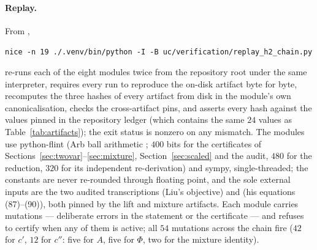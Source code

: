 \documentclass[11pt]{article}
\theoremstyle{plain}
\theoremstyle{definition}
\theoremstyle{remark}
\begin{document}
\paragraph{Replay.}
From ,
\begin{center}
\texttt{nice -n 19 ./.venv/bin/python -I -B uc/verification/replay\_h2\_chain.py}
\end{center}
re-runs each of the eight modules twice from the repository root under the
same interpreter, requires every run to reproduce the on-disk artifact byte
for byte, recomputes the three hashes of every artifact from disk in the
module's own canonicalisation, checks the cross-artifact pins, and asserts
every hash against the values pinned in the repository ledger
 (which contains the same $24$ values as
Table~\ref{tab:artifacts}); the exit status is nonzero on any mismatch.
The modules use python-flint (Arb ball arithmetic \cite{Joh17}; $400$ bits
for the certificates of Sections~\ref{sec:twovar}--\ref{sec:mixture},
Section~\ref{sec:scaled} and the
audit, $480$ for the reduction, $320$ for its independent re-derivation) and
sympy, single-threaded; the constants are
never re-rounded through floating point, and the sole external inputs are
the two audited transcriptions  (Liu's objective)
and  (his equations (87)--(90)), both pinned by the
lift and mixture artifacts.  Each module carries mutations --- deliberate
errors in the statement or the certificate --- and refuses to certify when
any of them is active; all $54$ mutations across the chain fire ($42$ for
$c'$, $12$ for $c''$: five for $A$, five for $\Phi$, two for the mixture
identity).
\end{document}

